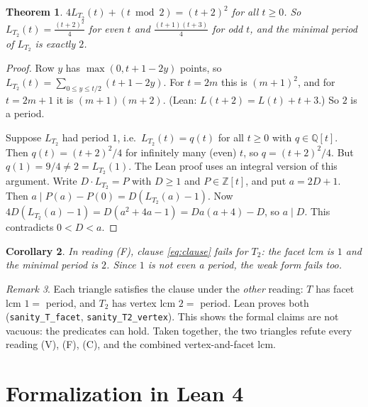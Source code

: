 \documentclass[11pt]{article}
\newtheorem{theorem}{Theorem}
\newtheorem{corollary}[theorem]{Corollary}
\theoremstyle{definition}
\theoremstyle{remark}
\newtheorem{remark}[theorem]{Remark}
\newcommand{\Z}{\mathbb Z}
\newcommand{\Q}{\mathbb Q}
\begin{document}
\begin{theorem}\label{thm:T2}
$4L_{T_2}(t)+(t\bmod 2)=(t+2)^2$ for all $t\ge0$. So $L_{T_2}(t)=\frac{(t+2)^2}{4}$ for even
$t$ and $\frac{(t+1)(t+3)}{4}$ for odd $t$, and the minimal period of $L_{T_2}$ is exactly $2$.
\end{theorem}

\begin{proof}
Row $y$ has $\max(0,t+1-2y)$ points, so $L_{T_2}(t)=\sum_{0\le y\le t/2}(t+1-2y)$. For $t=2m$
this is $(m+1)^2$, and for $t=2m+1$ it is $(m+1)(m+2)$. (Lean: $L(t+2)=L(t)+t+3$.) So $2$ is a period.

Suppose $L_{T_2}$ had period $1$, i.e.\ $L_{T_2}(t)=q(t)$ for all $t\ge0$ with $q\in\Q[t]$. Then
$q(t)=(t+2)^2/4$ for infinitely many (even) $t$, so $q=(t+2)^2/4$. But $q(1)=9/4\ne2=L_{T_2}(1)$.
The Lean proof uses an integral version of this argument. Write $D\cdot L_{T_2}=P$ with $D\ge1$ and
$P\in\Z[t]$, and put $a=2D+1$. Then $a\mid P(a)-P(0)=D(L_{T_2}(a)-1)$. Now
$4D(L_{T_2}(a)-1)=D(a^2+4a-1)=Da(a+4)-D$, so $a\mid D$. This contradicts $0<D<a$.
\end{proof}

\begin{corollary}
In reading (F), clause \eqref{eq:clause} fails for $T_2$: the facet lcm is $1$ and the minimal
period is $2$. Since $1$ is not even \emph{a} period, the weak form fails too.
\end{corollary}

\begin{remark}
Each triangle satisfies the clause under the \emph{other} reading: $T$ has facet lcm $1=$ period, and
$T_2$ has vertex lcm $2=$ period. Lean proves both (\texttt{sanity\_T\_facet},
\texttt{sanity\_T2\_vertex}). This shows the formal claims are not vacuous: the predicates can hold. Taken
together, the two triangles refute every reading (V), (F), (C), and the combined vertex-and-facet
lcm.
\end{remark}

\section{Formalization in Lean 4}
\end{document}
